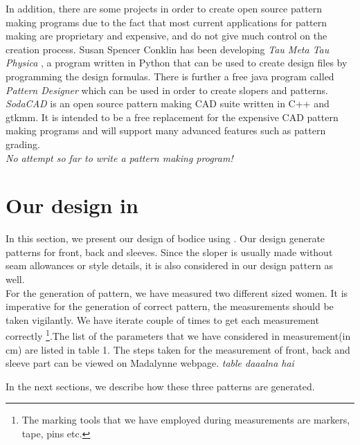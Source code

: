 \documentclass[10pt,letterpaper]{ltugboat}
\begin{document}
In addition, there are some projects in order to create open source pattern making programs due to the fact that most current applications for pattern making are proprietary and expensive, and do not give much control on the creation process. Susan Spencer Conklin has been developing \textit{Tau Meta Tau Physica} \cite{taumeta}, a program written in Python that can be used to create design files by programming the design formulas. There is further a free java program called \textit{Pattern Designer} \cite{patterndesigner} which can be used in order to create slopers and patterns. \textit{SodaCAD} \cite{sodacad} is an open source pattern making CAD suite written in C++ and gtkmm. It is intended to be a free replacement for the expensive CAD pattern making programs and will support many advanced features such as pattern grading.\\
\textit{No attempt so far to write a \MP { }pattern making program!}


\section{Our design in \MP { }}
In this section, we present our design of bodice using \MP. Our design generate  patterns for front, back and sleeves. Since the sloper is usually made without seam allowances or style details, it is also considered in our design pattern as well.\\
For the generation of pattern, we have measured two different sized women. It is imperative for the generation of correct pattern, the measurements should be taken vigilantly. We have iterate couple of times to get each measurement correctly \footnote{ The marking tools that we have employed during measurements are markers, tape, pins etc.}.The list of the parameters that we have considered in measurement(in cm) are listed in table 1. The steps taken for the measurement of front, back and sleeve part can be viewed on Madalynne webpage\cite{maddie}.
\textit{table daaalna hai}

In the next sections, we describe how these three patterns are generated.
\end{document}
